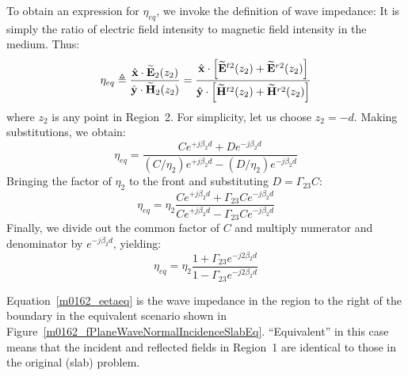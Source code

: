 To obtain an expression for $\eta_{eq}$, we invoke the definition of wave impedance:  It is simply the ratio of electric field intensity to magnetic field intensity in the medium.  Thus:
%
\begin{equation}
\eta_{eq}  
\triangleq \frac{ \hat{\bf x} \cdot \widetilde{\bf E}_2(z_2) }{ \hat{\bf y} \cdot \widetilde{\bf H}_2(z_2) }
= \frac{ \hat{\bf x} \cdot \left[ \widetilde{\bf E}^{t2}(z_2) + \widetilde{\bf E}^{r2}(z_2) \right] }{ \hat{\bf y} \cdot  \left[ \widetilde{\bf H}^{t2}(z_2) + \widetilde{\bf H}^{r2}(z_2) \right]  }
\end{equation}
%
where $z_2$ is any point in Region~2.  For simplicity, let us choose $z_2 = -d$.  Making substitutions, we obtain:  
%
\begin{equation}
\eta_{eq}  
= \frac{ C e^{+j\beta_2 d} + D e^{-j\beta_2 d} }{ \left(C/\eta_2\right) e^{+j\beta_2 d} - \left(D/\eta_2\right) e^{-j\beta_2 d} }
\end{equation}
%
Bringing the factor of $\eta_2$ to the front and substituting $D = \Gamma_{23} C$:
%
\begin{equation}
\eta_{eq}  
= \eta_2 \frac{ C e^{+j\beta_2 d} + \Gamma_{23} C e^{-j\beta_2 d} }{ C e^{+j\beta_2 d} - \Gamma_{23} C e^{-j\beta_2 d} }
\end{equation}
%
Finally, we divide out the common factor of $C$ and multiply numerator and denominator by $e^{-j\beta_2 d}$, yielding:
%
\begin{equation}
\boxed{
\eta_{eq}  
= \eta_2 \frac{ 1 + \Gamma_{23} e^{-j2\beta_2 d} }{ 1 - \Gamma_{23} e^{-j2\beta_2 d} }
}
\label{m0162_eetaeq}
\end{equation}
%
\begin{mdframed}[backgroundcolor=yellow!20,nobreak=true] 
Equation~\ref{m0162_eetaeq} is the wave impedance in the region to the right of the boundary in the equivalent scenario shown in Figure~\ref{m0162_fPlaneWaveNormalIncidenceSlabEq}.  ``Equivalent'' in this case means that the incident and reflected fields in Region~1 are identical to those in the original (slab) problem. 
\end{mdframed}

